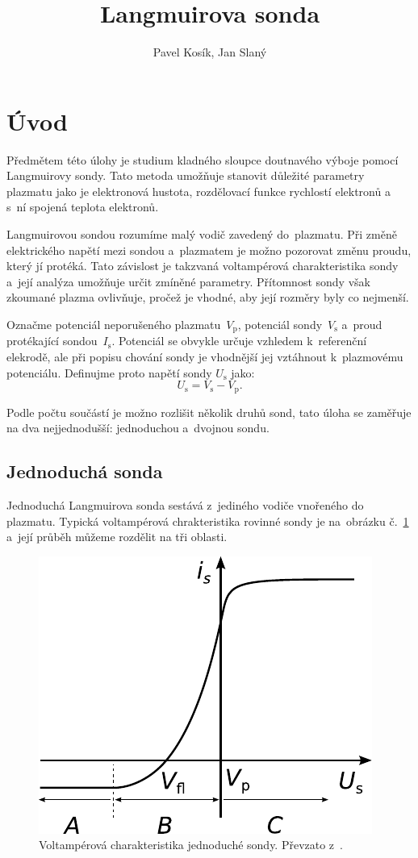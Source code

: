 \documentclass{protokol}
\title{Langmuirova sonda}
\author{Pavel Kosík, Jan Slaný}
\newcommand\iprobe{I_\mathrm{s}}
\newcommand\plpot{V_\mathrm{p}}
\newcommand\potprobe{V_\mathrm{s}}
\newcommand\uprobe{U_\mathrm{s}}
\begin{document}
\header

\newcommand\parta{A}
\newcommand\partb{B}
\newcommand\partc{C}
\newcommand\probesurf{S}
\newcommand\tempelec{T_\mathrm{e}}
\section{Úvod}
Předmětem této úlohy je studium kladného sloupce doutnavého výboje
pomocí Langmuirovy sondy.
Tato metoda umožňuje stanovit důležité parametry plazmatu jako je
elektronová hustota, rozdělovací funkce rychlostí elektronů
a s~ní spojená teplota elektronů.

Langmuirovou sondou rozumíme malý vodič zavedený do~plazmatu.
Při změně elektrického napětí mezi sondou a~plazmatem je možno pozorovat
změnu proudu, který jí protéká.
Tato závislost je takzvaná voltampérová charakteristika sondy
a~její analýza umožňuje určit zmíněné parametry.
Přítomnost sondy však zkoumané plazma ovlivňuje,
pročež je vhodné, aby její rozměry byly co nejmenší.

Označme potenciál neporušeného plazmatu~$\plpot$,
potenciál sondy~$\potprobe$ a~proud protékající sondou~$\iprobe$.
Potenciál se obvykle určuje vzhledem k~referenční elekrodě,
ale při popisu chování sondy je vhodnější jej vztáhnout k~plazmovému
potenciálu.
Definujme proto napětí sondy $\uprobe$ jako:
\begin{equation}
	\label{eq:uprobe}
	\uprobe = \potprobe - \plpot.
\end{equation}

Podle počtu součástí je možno rozlišit několik druhů sond,
tato úloha se zaměřuje na dva nejjednodušší: jednoduchou a~dvojnou sondu.

\subsection{Jednoduchá sonda}
Jednoduchá Langmuirova sonda sestává z~jediného vodiče vnořeného do plazmatu.
Typická voltampérová chrakteristika rovinné sondy je na~obrázku
č.~\ref{fig:vac-simple} a~její průběh můžeme rozdělit na tři oblasti.

\begin{figure}[hbp]
	\centering
	\includegraphics{vac-simple}
	\caption{Voltampérová charakteristika jednoduché sondy.
		Převzato z~\autocite{assignment-simpleprobe}.}
	\label{fig:vac-simple}
\end{figure}
\end{document}
